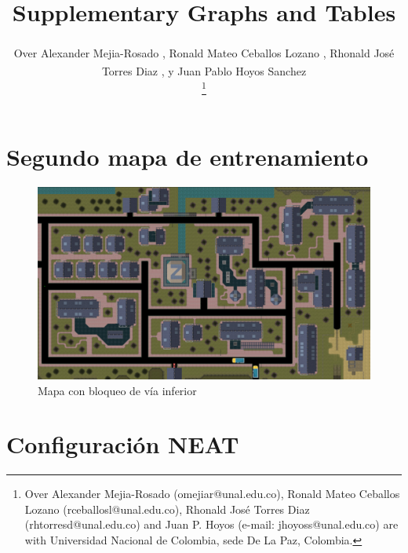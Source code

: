 \documentclass[lettersize, journal]{IEEEtran}
\begin{document}
\title{Supplementary Graphs and Tables}

\author{Over Alexander Mejia-Rosado \textsuperscript{\href{https://orcid.org/0009-0008-8152-2754}{\textcolor{orcidcolor}{\faOrcid}}}, 
Ronald Mateo Ceballos Lozano \textsuperscript{\href{https://orcid.org/0009-0003-6478-3286}{\textcolor{orcidcolor}{\faOrcid}}}, 
Rhonald José Torres Diaz \textsuperscript{\href{mailto:rhtorresd@unal.edu.co}{\textcolor{orcidcolor}{}}}, y 
Juan Pablo Hoyos Sanchez \textsuperscript{\href{mailto:jhoyoss@unal.edu.co}{\textcolor{orcidcolor}{}}}

\thanks{Over Alexander Mejia-Rosado (omejiar@unal.edu.co), Ronald Mateo Ceballos Lozano (rceballosl@unal.edu.co), Rhonald José Torres Diaz (rhtorresd@unal.edu.co) and Juan P. Hoyos (e-mail: jhoyoss@unal.edu.co) are with Universidad Nacional de Colombia, sede De La Paz, Colombia.}%
}

\maketitle
\section{Segundo mapa de entrenamiento}
\setcounter{figure}{0}
\renewcommand{\thefigure}{S\arabic{figure}-MAP}
\begin{figure}[H]
    \centering    \includegraphics[width=1\linewidth]{Simulacion/gta.png}
    \caption{Mapa con bloqueo de vía inferior}
    \label{fig:mapa2}
\end{figure}

\section{Configuración NEAT}
\end{document}
